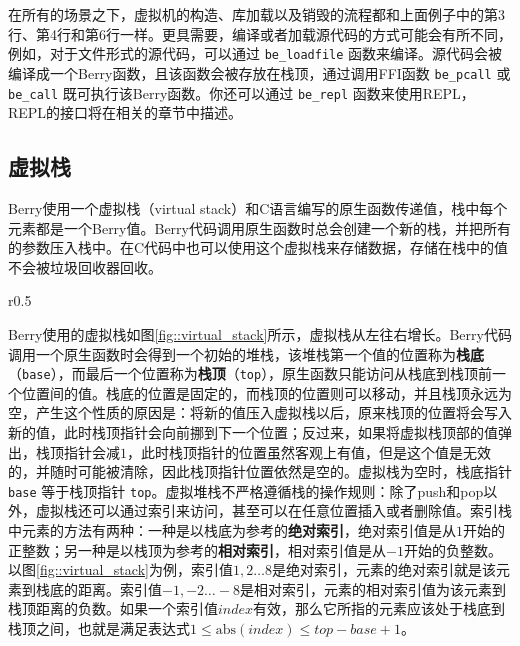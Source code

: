 在所有的场景之下，虚拟机的构造、库加载以及销毁的流程都和上面例子中的第3行、第4行和第6行一样。更具需要，编译或者加载源代码的方式可能会有所不同，例如，对于文件形式的源代码，可以通过 \texttt{be\_loadfile} 函数来编译。源代码会被编译成一个Berry函数，且该函数会被存放在栈顶，通过调用FFI函数 \texttt{be\_pcall} 或 \texttt{be\_call} 既可执行该Berry函数。你还可以通过 \texttt{be\_repl} 函数来使用REPL，REPL的接口将在相关的章节中描述。

\subsection{虚拟栈}

Berry使用一个虚拟栈（virtual stack）和C语言编写的原生函数传递值，栈中每个元素都是一个Berry值。Berry代码调用原生函数时总会创建一个新的栈，并把所有的参数压入栈中。在C代码中也可以使用这个虚拟栈来存储数据，存储在栈中的值不会被垃圾回收器回收。

\begin{wrapfigure}{r}{0.5\textwidth}
\centering
{}
\caption{虚拟栈}
\label{fig::virtual_stack}
\end{wrapfigure}

Berry使用的虚拟栈如图\ref{fig::virtual_stack}所示，虚拟栈从左往右增长。Berry代码调用一个原生函数时会得到一个初始的堆栈，该堆栈第一个值的位置称为\textbf{栈底}（\texttt{base}），而最后一个位置称为\textbf{栈顶}（\texttt{top}），原生函数只能访问从栈底到栈顶前一个位置间的值。栈底的位置是固定的，而栈顶的位置则可以移动，并且栈顶永远为空，产生这个性质的原因是：将新的值压入虚拟栈以后，原来栈顶的位置将会写入新的值，此时栈顶指针会向前挪到下一个位置；反过来，如果将虚拟栈顶部的值弹出，栈顶指针会减$1$，此时栈顶指针的位置虽然客观上有值，但是这个值是无效的，并随时可能被清除，因此栈顶指针位置依然是空的。虚拟栈为空时，栈底指针 \texttt{base} 等于栈顶指针 \texttt{top}。虚拟堆栈不严格遵循栈的操作规则：除了push和pop以外，虚拟栈还可以通过索引来访问，甚至可以在任意位置插入或者删除值。索引栈中元素的方法有两种：一种是以栈底为参考的\textbf{绝对索引}，绝对索引值是从$1$开始的正整数；另一种是以栈顶为参考的\textbf{相对索引}，相对索引值是从$-1$开始的负整数。以图\ref{fig::virtual_stack}为例，索引值$1,2\ldots 8$是绝对索引，元素的绝对索引就是该元素到栈底的距离。索引值$-1,-2\ldots -8$是相对索引，元素的相对索引值为该元素到栈顶距离的负数。如果一个索引值$index$有效，那么它所指的元素应该处于栈底到栈顶之间，也就是满足表达式$1\leq \mathrm{abs}(index)\leq top-base+1$。

